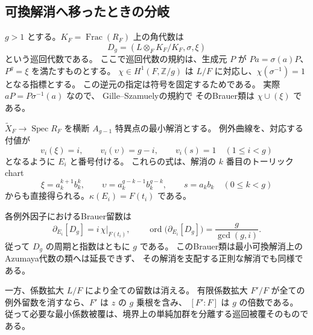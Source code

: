 \subsection{可換解消へ移ったときの分岐}

$g>1$ とする。$K_F=\operatorname{Frac}(R_F)$ 上の角代数は
\[
 D_g=(L\otimes_F K_F/K_F,\sigma,\xi)
\]
という巡回代数である。
ここで巡回代数の規約は、生成元 $P$ が $Pa=\sigma(a)P$、$P^g=\xi$ を満たすものとする。
$\chi\in H^1(F,\mathbb Z/g)$ は $L/F$ に対応し、$\chi(\sigma^{-1})=1$ となる指標とする。
この逆元の指定は符号を固定するためである。
実際 $aP=P\sigma^{-1}(a)$ なので、
Gille--Szamuely\cite[Propositions~2.5.2 and~4.7.3]{GilleSzamuelyBrauer40}の規約で
そのBrauer類は $\chi\cup(\xi)$ である。

$\widetilde X_F\to\operatorname{Spec}R_F$ を横断 $A_{g-1}$ 特異点の最小解消とする。
例外曲線を、対応する付値が
\begin{equation}\label{eq:boundary-exceptional-valuations-v40}
 v_i(\xi)=i,\qquad v_i(\upsilon)=g-i,\qquad v_i(s)=1
 \quad(1\le i<g)
\end{equation}
となるように $E_i$ と番号付ける。
これらの式は、解消の $k$ 番目のトーリックchart
\[
 \xi=a_k^{k+1}b_k^k,\qquad
 \upsilon=a_k^{g-k-1}b_k^{g-k},\qquad s=a_kb_k
 \quad(0\le k<g)
\]
からも直接得られる。$\kappa(E_i)=F(t_i)$ である。

\begin{theorem}[単純加群の被覆とBrauer留数]
\label{thm:boundary-residues-v40}
各例外因子におけるBrauer留数は
\begin{equation}\label{eq:boundary-residues-v40}
 \partial_{E_i}[D_g]=i\,\chi|_{F(t_i)},\qquad
 \operatorname{ord}\bigl(\partial_{E_i}[D_g]\bigr)=\frac{g}{\gcd(g,i)}.
\end{equation}
従って $D_g$ の周期と指数はともに $g$ である。
このBrauer類は最小可換解消上のAzumaya代数の類へは延長できず、
その解消を支配する正則な解消でも同様である。

一方、係数拡大 $L/F$ により全ての留数は消える。
有限係数拡大 $F'/F$ が全ての例外留数を消すなら、$F'$ は $z$ の $g$ 乗根を含み、
$[F':F]$ は $g$ の倍数である。
従って必要な最小係数被覆は、境界上の単純加群を分離する巡回被覆そのものである。
\end{theorem}

